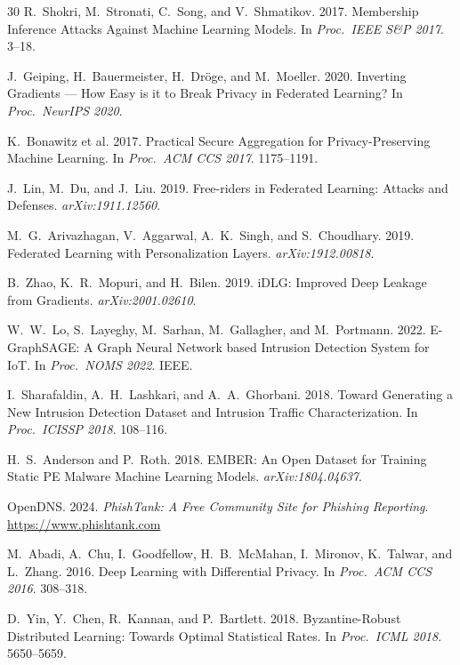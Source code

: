\documentclass[sigconf,nonacm]{acmart}
\begin{document}
\begin{thebibliography}{30}
R.~Shokri, M.~Stronati, C.~Song, and V.~Shmatikov. 2017. Membership Inference
Attacks Against Machine Learning Models. In \textit{Proc.\ IEEE S\&P 2017}.
3--18.

J.~Geiping, H.~Bauermeister, H.~Dr\"oge, and M.~Moeller. 2020. Inverting
Gradients --- How Easy is it to Break Privacy in Federated Learning?
In \textit{Proc.\ NeurIPS 2020}.

K.~Bonawitz et al. 2017. Practical Secure Aggregation for Privacy-Preserving
Machine Learning. In \textit{Proc.\ ACM CCS 2017}. 1175--1191.

J.~Lin, M.~Du, and J.~Liu. 2019. Free-riders in Federated Learning:
Attacks and Defenses. \textit{arXiv:1911.12560}.

M.~G.~Arivazhagan, V.~Aggarwal, A.~K.~Singh, and S.~Choudhary. 2019.
Federated Learning with Personalization Layers. \textit{arXiv:1912.00818}.

B.~Zhao, K.~R.~Mopuri, and H.~Bilen. 2019. iDLG: Improved Deep Leakage
from Gradients. \textit{arXiv:2001.02610}.

W.~W.~Lo, S.~Layeghy, M.~Sarhan, M.~Gallagher, and M.~Portmann. 2022.
E-GraphSAGE: A Graph Neural Network based Intrusion Detection System for IoT.
In \textit{Proc.\ NOMS 2022}. IEEE.

I.~Sharafaldin, A.~H.~Lashkari, and A.~A.~Ghorbani. 2018. Toward Generating
a New Intrusion Detection Dataset and Intrusion Traffic Characterization.
In \textit{Proc.\ ICISSP 2018}. 108--116.

H.~S.~Anderson and P.~Roth. 2018. EMBER: An Open Dataset for Training Static
PE Malware Machine Learning Models. \textit{arXiv:1804.04637}.

OpenDNS. 2024. \textit{PhishTank: A Free Community Site for Phishing Reporting}.
\url{https://www.phishtank.com}

M.~Abadi, A.~Chu, I.~Goodfellow, H.~B.~McMahan, I.~Mironov, K.~Talwar, and
L.~Zhang. 2016. Deep Learning with Differential Privacy. In
\textit{Proc.\ ACM CCS 2016}. 308--318.

D.~Yin, Y.~Chen, R.~Kannan, and P.~Bartlett. 2018. Byzantine-Robust
Distributed Learning: Towards Optimal Statistical Rates.
In \textit{Proc.\ ICML 2018}. 5650--5659.

\end{thebibliography}
\end{document}

